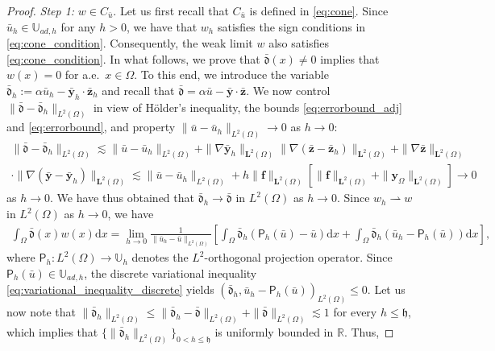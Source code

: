 \documentclass[final]{siamart0216}
\begin{document}
\begin{proof}
\emph{Step 1:} \emph{$w\in C_{\bar{u}}$}. Let us first recall that $C_{\bar{u}}$ is defined in \eqref{eq:cone}. Since $\bar{u}_{h} \in \mathbb{U}_{ad,h}$ for any $h>0$, we have that $w_h$ satisfies the sign conditions in \eqref{eq:cone_condition}. Consequently, the weak limit $w$ also satisfies \eqref{eq:cone_condition}. In what follows, we prove that $\bar{\mathfrak{d}}(x) \neq 0$ implies that $w(x)=0$ for a.e.~$x\in\Omega$. To this end, we introduce the variable $\bar{\mathfrak{d}}_h:=\alpha \bar{u}_h-\bar{\mathbf{y}}_h\cdot\bar{\mathbf{z}}_h$ and recall that $\bar{\mathfrak{d}}=\alpha \bar{u}-\bar{\mathbf{y}}\cdot\bar{\mathbf{z}}$. We now control $\|\bar{\mathfrak{d}} - \bar{\mathfrak{d}}_h\|_{L^2(\Omega)}$ in view of H\"older's inequality, the bounds \eqref{eq:errorbound_adj} and \eqref{eq:errorbound}, and property $\|\bar{u}-\bar{u}_h\|_{L^2(\Omega)}\to 0$ as $h\rightarrow 0$:
\begin{multline*}
\|\bar{\mathfrak{d}}-\bar{\mathfrak{d}}_h\|_{L^2(\Omega)}\lesssim \|\bar{u}-\bar{u}_h\|_{L^2(\Omega)}+\|\nabla\bar{\mathbf{y}}_h\|_{\mathbf{L}^2(\Omega)}\|\nabla( \bar{\mathbf{z}}-\bar{\mathbf{z}}_h)\|_{\mathbf{L}^2(\Omega)}
+ \|\nabla\bar{\mathbf{z}}\|_{\mathbf{L}^2(\Omega)}
\\
\cdot \|\nabla( \bar{\mathbf{y}}-\bar{\mathbf{y}}_h)\|_{\mathbf{L}^2(\Omega)}\lesssim \|\bar{u}-\bar{u}_h\|_{L^2(\Omega)} + h \|\mathbf{f}\|_{\mathbf{L}^2(\Omega)}[\|\mathbf{f}\|_{\mathbf{L}^2(\Omega)} + \| \mathbf{y}_{\Omega} \|_{\mathbf{L}^2(\Omega)}]
\to 0
\end{multline*}
as $h \rightarrow 0$. We have thus obtained that $\bar{\mathfrak{d}}_h \rightarrow \bar{\mathfrak{d}}$ in $L^2(\Omega)$ as $h \rightarrow 0$. Since $w_h \rightharpoonup w$ in $L^2(\Omega)$ as $h\rightarrow 0$, we have
\begin{eqnarray*}
\int_{\Omega}\bar{\mathfrak{d}}(x)w(x)\mathrm{d}x=
\lim_{h\rightarrow 0} \frac{1}{\|\bar{u}_h-\bar{u}\|_{L^2(\Omega)}}
\left[\int_{\Omega}\bar{\mathfrak{d}}_h(\mathsf{P}_h(\bar{u})-\bar{u})\mathrm{d}x+\int_{\Omega}\bar{\mathfrak{d}}_h(\bar{u}_h-\mathsf{P}_h(\bar{u}))\mathrm{d}x\right],
\end{eqnarray*}
where $\mathsf{P}_h: L^2(\Omega) \rightarrow \mathbb{U}_h$ denotes the $L^2$-orthogonal projection operator. Since $\mathsf{P}_h(\bar{u})\in \mathbb{U}_{ad,h}$, the discrete variational inequality \eqref{eq:variational_inequality_discrete} yields $(\bar{\mathfrak{d}}_h,\bar{u}_h-\mathsf{P}_h(\bar{u}))_{L^2(\Omega)}\leq 0$. Let us now note that $\|\bar{\mathfrak{d}}_h\|_{L^2(\Omega)}\leq\|\bar{\mathfrak{d}}_h-\bar{\mathfrak{d}}\|_{L^2(\Omega)}+\|\bar{\mathfrak{d}}\|_{L^2(\Omega)}\lesssim 1$ for every $h \leq \mathfrak{h}$, which implies that $\{\|\bar{\mathfrak{d}}_h\|_{L^2(\Omega)}\}_{0 < h \leq \mathfrak{h}}$ is uniformly bounded in $\mathbb{R}$. Thus, 

\end{proof}
\end{document}

